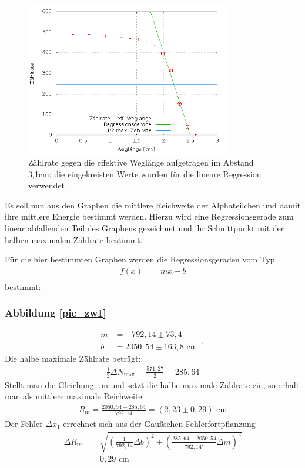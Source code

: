 \begin{figure}[H]
\includegraphics[width=0.8\textwidth]{pics/zaehlrate_weglaenge2.png}
\caption{Zählrate gegen die effektive Weglänge aufgetragen im Abstand 3,1cm; die eingekreisten Werte wurden für die lineare Regression verwendet}
\label{pic_zw2}
\end{figure}

Es soll nun aus den Graphen die mittlere Reichweite der Alphateilchen und damit ihre mittlere Energie bestimmt werden. Hierzu wird eine Regressionsgerade zum linear abfallenden Teil des Graphens gezeichnet und ihr Schnittpunkt mit der halben maximalen Zählrate bestimmt.

Für die hier bestimmten Graphen werden die Regressionsgeraden vom Typ
\begin{align*}
f(x)&=mx+b\\
\end{align*}
bestimmt: 
\subsubsection{Abbildung \ref{pic_zw1}}
\begin{align*}
m&=-792,14 \pm 73,4\\
b&= 2050,54 \pm 163,8 \text{ cm}^{-1}
\end{align*}
Die halbe maximale Zählrate beträgt:
\begin{align*}
 \frac{1}{2}\Delta N_\text{max} = \frac{571,27}{2} = 285,64
\end{align*}
Stellt man die Gleichung um und setzt die halbe maximale Zählrate ein, so erhalt man als mittlere maximale Reichweite:
\begin{align*}
R_\text{m}=\frac{2050,54-285,64}{792,14} = (2,23\pm0,29)\text{ cm}
\end{align*}
Der Fehler $\Delta x_1$ errechnet sich aus der Gaußschen Fehlerfortpflanzung
\begin{align*}
\Delta R_m&=\sqrt{\left(\frac{1}{792,14}\Delta b\right)^2+\left(\frac{285,64-2050,54}{792,14^2}\Delta m\right)^2}\\ 
&= 0,29 \text{ cm}
\end{align*}

